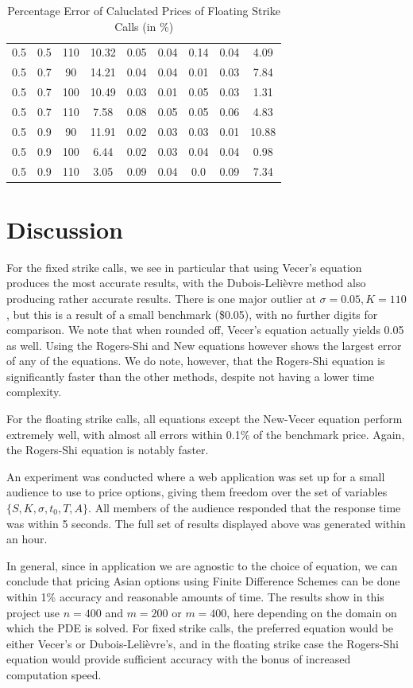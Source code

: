 \documentclass{article}
\begin{document}
\begin{table}[H]
\begin{tabular}{|c|c|c|c|c|c|c|c|c|}
  0.5 & 0.5 & 110 & 10.32 & 0.05 & 0.04 & 0.14 & 0.04 & 4.09 \\
  0.5 & 0.7 & 90 & 14.21 & 0.04 & 0.04 & 0.01 & 0.03 & 7.84 \\
  0.5 & 0.7 & 100 & 10.49 & 0.03 & 0.01 & 0.05 & 0.03 & 1.31 \\
  0.5 & 0.7 & 110 & 7.58 & 0.08 & 0.05 & 0.05 & 0.06 & 4.83 \\
  0.5 & 0.9 & 90 & 11.91 & 0.02 & 0.03 & 0.03 & 0.01 & 10.88 \\
  0.5 & 0.9 & 100 & 6.44 & 0.02 & 0.03 & 0.04 & 0.04 & 0.98 \\
  0.5 & 0.9 & 110 & 3.05 & 0.09 & 0.04 & 0.0 & 0.09 & 7.34 \\
  \hline
  \end{tabular}
  \caption{Percentage Error of Caluclated Prices of Floating Strike Calls (in \%)}
  \label{table:name}
\end{table}
\normalsize

\section{Discussion}
For the fixed strike calls, we see in particular that using Vecer's equation produces the most accurate results, with the Dubois-Leli\`evre method also producing rather accurate results. There is one major outlier at \(\sigma=0.05, K=110\), but this is a result of a small benchmark (\$0.05), with no further digits for comparison. We note that when rounded off, Vecer's equation actually yields 0.05 as well. Using the Rogers-Shi and New equations however shows the largest error of any of the equations. We do note, however, that the Rogers-Shi equation is significantly faster than the other methods, despite not having a lower time complexity.

For the floating strike calls, all equations except the New-Vecer equation perform extremely well, with almost all errors within 0.1\% of the benchmark price. Again, the Rogers-Shi equation is notably faster.

An experiment was conducted where a web application was set up for a small audience to use to price options, giving them freedom over the set of variables \(\{S, K, \sigma, t_0, T, A\}\). All members of the audience responded that the response time was within 5 seconds. The full set of results displayed above was generated within an hour.

In general, since in application we are agnostic to the choice of equation, we can conclude that pricing Asian options using Finite Difference Schemes can be done within 1\% accuracy and reasonable amounts of time. The results show in this project use \(n=400\) and \(m = 200\) or \(m=400\), here depending on the domain on which the PDE is solved. For fixed strike calls, the preferred equation would be either Vecer's or Dubois-Leli\`evre's, and in the floating strike case the Rogers-Shi equation would provide sufficient accuracy with the bonus of increased computation speed.
\end{document}
